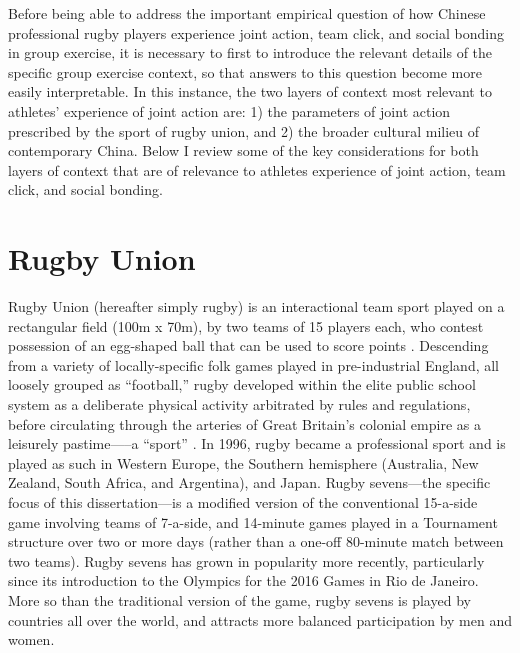 \begin{CJK}{UTF8}{gbsn}

Before being able to address the important empirical question of how Chinese professional rugby players experience joint action, team click, and social bonding in group exercise, it is necessary to first to introduce the relevant details of the specific group exercise context, so that answers to this question become more easily interpretable.  In this instance, the two layers of context most relevant to athletes’ experience of joint action are: 1) the parameters of joint action prescribed by the sport of rugby union, and 2) the broader cultural milieu of contemporary China.  Below I review some of the key considerations for both layers of context that are of relevance to athletes experience of joint action, team click, and social bonding.


\section{Rugby Union\label{sect:rugbyUnion}}
Rugby Union (hereafter simply rugby) is an interactional team sport played on a rectangular field (100m x 70m), by two teams of 15 players each, who contest possession of an egg-shaped ball that can be used to score points \citep{IRB2014}.  Descending from a variety of locally-specific folk games played in pre-industrial England, all loosely grouped as ``football,'' rugby developed within the elite public school system as a deliberate physical activity arbitrated by rules and regulations, before circulating through the arteries of Great Britain's colonial empire as a leisurely pastime—--a ``sport'' \citep{Dunning2005}.  In 1996, rugby became a professional sport and is played as such in Western Europe, the Southern hemisphere (Australia, New Zealand, South Africa, and Argentina), and Japan. Rugby sevens---the specific focus of this dissertation---is a modified version of the conventional 15-a-side game involving teams of 7-a-side, and 14-minute games played in a Tournament structure over two or more days (rather than a one-off 80-minute match between two teams).  Rugby sevens has grown in popularity more recently, particularly since its introduction to the Olympics for the 2016 Games in Rio de Janeiro.  More so than the traditional version of the game, rugby sevens is played by countries all over the world, and attracts more balanced participation by men and women.


\end{CJK}
